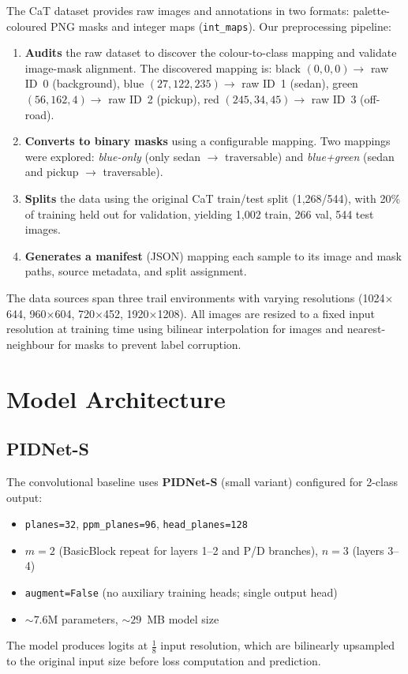 \documentclass[12pt,a4paper]{report}
\begin{document}
The CaT dataset provides raw images and annotations in two formats: palette-coloured PNG masks and integer maps (\texttt{int\_maps}).
Our preprocessing pipeline:
\begin{enumerate}[nosep]
  \item \textbf{Audits} the raw dataset to discover the colour-to-class mapping and validate image-mask alignment.
        The discovered mapping is:
        black $(0,0,0) \rightarrow$ raw ID~0 (background),
        blue $(27,122,235) \rightarrow$ raw ID~1 (sedan),
        green $(56,162,4) \rightarrow$ raw ID~2 (pickup),
        red $(245,34,45) \rightarrow$ raw ID~3 (off-road).
  \item \textbf{Converts to binary masks} using a configurable mapping.
        Two mappings were explored:
        \emph{blue-only} (only sedan $\rightarrow$ traversable) and
        \emph{blue+green} (sedan and pickup $\rightarrow$ traversable).
  \item \textbf{Splits} the data using the original CaT train/test split (1{,}268/544), with 20\% of training held out for validation, yielding 1{,}002 train, 266 val, 544 test images.
  \item \textbf{Generates a manifest} (JSON) mapping each sample to its image and mask paths, source metadata, and split assignment.
\end{enumerate}

The data sources span three trail environments with varying resolutions (1024$\times$644, 960$\times$604, 720$\times$452, 1920$\times$1208).
All images are resized to a fixed input resolution at training time using bilinear interpolation for images and nearest-neighbour for masks to prevent label corruption.

\section{Model Architecture}

\subsection{PIDNet-S}

The convolutional baseline uses \textbf{PIDNet-S} (small variant) configured for 2-class output:
\begin{itemize}[nosep]
  \item \texttt{planes=32}, \texttt{ppm\_planes=96}, \texttt{head\_planes=128}
  \item $m{=}2$ (BasicBlock repeat for layers 1--2 and P/D branches), $n{=}3$ (layers 3--4)
  \item \texttt{augment=False} (no auxiliary training heads; single output head)
  \item ${\sim}7.6$M parameters, ${\sim}29$~MB model size
\end{itemize}
The model produces logits at $\frac{1}{8}$ input resolution, which are bilinearly upsampled to the original input size before loss computation and prediction.
\end{document}
